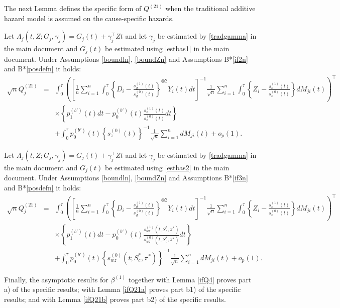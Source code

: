 \documentclass[11pt]{article}
\newcommand{\eqnn}{\begin{eqnarray*}}
\newcommand{\een}{\end{eqnarray*}}
\begin{document}
The next Lemma defines the specific form of $Q^{(21)}$ when the traditional additive hazard model is assumed on the cause-specific hazards.
\begin{lemmas}\label{ifQ21a}
Let $\Lambda_j(t,Z ; G_j, \gamma_j)=G_j(t) + \gamma_j^{\top} Z t$ and let  $\gamma_j$ be estimated by \eqref{tradgamma} in the main document and $G_j(t)$ be estimated using \eqref{estbas1} in the main document.
Under Assumptions \ref{boundln}, \ref{boundZn} and Assumptions B*\ref{if2n} and B*\ref{posdefn} it holds:
\eqnn
\sqrt{n}Q^{(21)}_j&=&\int_0^\tau \left(\left[\frac{1}{n}\sum_{i=1}^n\int_0^{\tau}\left\{D_i-\frac{s_d^{(1)}(t)}{s_d^{(0)}(t)}\right\}^{\otimes 2}Y_i(t)dt\right]^{-1}\frac{1}{\sqrt{n}}\sum_{i=1}^n
\int_0^\tau \left\{Z_i-\frac{s_z^{(1)}(t)}{s_z^{(0)}(t)}\right\}dM_{ji}(t)\right)^\top 
\\
&&
\times
\left\{p^{(b')}_{1}(t)dt -p^{(b')}_{0}(t)\frac{s_z^{(1)}(t)}{s_z^{(0)}(t)}dt\right\}
\\
&&+\int_0^\tau p^{(b')}_{0}(t)\left\{s_z^{(0)}(t)\right\}^{-1}\frac{1}{\sqrt{n}}\sum_{i=1}^ndM_{ji}(t)+o_p(1).
\een
\end{lemmas}
\begin{lemmas}\label{ifQ21b}
Let $\Lambda_j(t,Z ; G_j, \gamma_j)=G_j(t) + \gamma_j^{\top} Z t$ and let  $\gamma_j$ be estimated by \eqref{tradgamma} in the main document and $G_j(t)$ be estimated using \eqref{estbas2} in the main document.
Under Assumptions \ref{boundln}, \ref{boundZn} and Assumptions B*\ref{if3n} and B*\ref{posdefn} it holds:
\eqnn \sqrt{n}Q^{(21)}_j&=&\int_0^\tau \left(\left[\frac{1}{n}\sum_{i=1}^n\int_0^{\tau}\left\{D_i-\frac{s_d^{(1)}(t)}{s_d^{(0)}(t)}\right\}^{\otimes 2}Y_i(t)dt\right]^{-1}\frac{1}{\sqrt{n}}\sum_{i=1}^n
\int_0^\tau \left\{Z_i-\frac{s_z^{(1)}(t)}{s_z^{(0)}(t)}\right\}dM_{ji}(t)\right)^\top 
\\
&&
\times
\left\{p^{(b')}_{1}(t)dt -p^{(b')}_{0}(t)\frac{s_{wz}^{(1)}(t; S^{*}_c,\pi^{*})}{s_{wz}^{(0)}(t; S^{*}_c,\pi^{*})}dt\right\}
\\
&&+\int_0^\tau p^{(b')}_{0}(t)\left\{s_{wz}^{(0)}(t; S^{*}_c,\pi^{*})\right\}^{-1}\frac{1}{\sqrt{n}}\sum_{i=1}^ndM_{ji}(t)+o_p(1).\een
\end{lemmas}

Finally, the asymptotic results for $\beta^{(1)}$ together with Lemma \ref{ifQ4} proves part a) of the specific results;
with Lemma \ref{ifQ21a} proves part b1) of the specific results; and
with Lemma \ref{ifQ21b} proves part b2) of the specific results.
\end{document}

